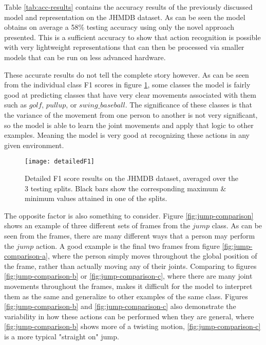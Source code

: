 Table \ref{tab:acc-results} contains the accuracy results of the previously discussed model and representation on the JHMDB dataset. As can be seen the model obtains on average a 58\% testing accuracy using only the novel approach presented. This is a sufficient accuracy to show that action recognition is possible with very lightweight representations that can then be processed via smaller models that can be run on less advanced hardware.

These accurate results do not tell the complete story however. As can be seen from the individual class F1 scores in figure \ref{fig:detailed-f1}, some classes the model is fairly good at predicting classes that have very clear movements associated with them such as $golf$, $pullup$, or $swing\_baseball$. The significance of these classes is that the variance of the movement from one person to another is not very significant, so the model is able to learn the joint movements and apply that logic to other examples. Meaning the model is very good at recognizing these actions in any given environment.

\begin{figure}[ht]
	\texttt{[image: detailedF1]}
	\centering
	\caption{Detailed F1 score results on the JHMDB dataset, averaged over the 3 testing splits. Black bars show the corresponding maximum \& minimum values attained in one of the splits.}
	\label{fig:detailed-f1}
\end{figure}

The opposite factor is also something to consider. Figure \ref{fig:jump-comparison} shows an example of three different sets of frames from the $jump$ class. As can be seen from the frames, there are many different ways that a person may perform the $jump$ action. A good example is the final two frames from figure \ref{fig:jump-comparison-a}, where the person simply moves throughout the global position of the frame, rather than actually moving any of their joints. Comparing to figures \ref{fig:jump-comparison-b} or \ref{fig:jump-comparison-c}, where there are many joint movements throughout the frames, makes it difficult for the model to interpret them as the same and generalize to other examples of the same class. Figures \ref{fig:jump-comparison-b} and \ref{fig:jump-comparison-c} also demonstrate the variability in how these actions can be performed when they are general, where \ref{fig:jump-comparison-b} shows more of a twisting motion, \ref{fig:jump-comparison-c} is a more typical "straight on" jump.

